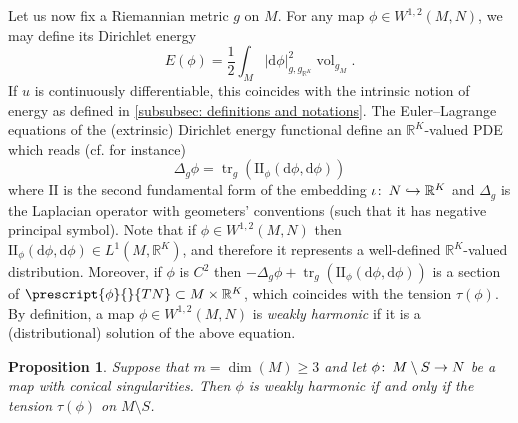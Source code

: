 \documentclass{article}
\numberwithin{equation}{section}        %
\theoremstyle{bfnote}
\newtheorem{prop}[thm]{Proposition}         %
\theoremstyle{definition}
\theoremstyle{bfremark}
\newcommand{\col}{\colon \thinspace}        %
\newcommand{\R}{\mathbb{R}}                 %
\newcommand{\II}{\mathrm{I\!I}}             %
\newcommand{\diff}{\mathrm{d}}                      %
\DeclareMathOperator{\vol}{vol}                 %
\DeclareMathOperator{\tr}{tr}                   %
\begin{document}
Let us now fix a Riemannian metric $g$ on $M$. For any map $\phi \in W^{1,2}(M,N)$, we may define its Dirichlet energy
\begin{equation*}
    E(\phi) = \frac{1}{2} \int_M |\diff\phi|^2_{g,g_{\R^K}} \vol_{g_M} .
\end{equation*}
If $u$ is continuously differentiable, this coincides with the intrinsic notion of energy as defined in \cref{subsubsec: definitions and notations}. The Euler--Lagrange equations of the (extrinsic) Dirichlet energy functional define an $\R^K$-valued PDE which reads (cf. \cite[Sec. 2]{helein2007harmonic} for instance)
\begin{equation}    \label{eq:weakel}
    \Delta_g \phi = \tr_g(\II_{\phi}(\diff\phi,\diff\phi)) 
\end{equation}
where $\II$ is the second fundamental form of the embedding $\iota \col N \hookrightarrow \R^K$ and $\Delta_g$ is the Laplacian operator with geometers' conventions (such that it has negative principal symbol). Note that if $\phi \in W^{1,2}(M,N)$ then $\II_{\phi}(\diff\phi,\diff\phi) \in L^1(M,\R^K)$, and therefore it represents a well-defined $\R^K$-valued distribution. Moreover, if $\phi$ is $C^2$ then $-\Delta_g \phi + \tr_g(\II_{\phi}(\diff\phi,\diff\phi))$ is a section of $\prescript{\phi}{}{TN} \subset M \times \R^K$, which coincides with the tension $\tau(\phi)$. By definition, a map $\phi \in W^{1,2}(M,N)$ is \emph{weakly harmonic} if it is a (distributional) solution of the above equation.

\begin{prop}        \label{lem: m geq 3}
    Suppose that $m = \dim(M) \geq 3$ and let $\phi \col M \setminus S \to N$ be a map with conical singularities. Then $\phi$ is weakly harmonic if and only if the tension $\tau(\phi)$ on $M \setminus S$.
\end{prop}
\end{document}
